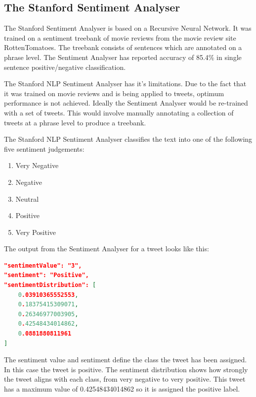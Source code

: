 \subsection*{The Stanford Sentiment Analyser}

The Stanford Sentiment Analyser is based on a Recursive Neural Network. It was trained on a sentiment treebank of movie reviews from the movie review site RottenTomatoes. The treebank consists of sentences which are annotated on a phrase level. The Sentiment Analyser has reported accuracy of 85.4\% in single sentence positive/negative classification. 

The Stanford NLP Sentiment Analyser has it's limitations. Due to the fact that it was trained on movie reviews and is being applied to tweets, optimum performance is not achieved. Ideally the Sentiment Analyser would be re-trained with a set of tweets. This would involve manually annotating a collection of tweets at a phrase level to produce a treebank.


The Stanford NLP Sentiment Analyser classifies the text into one of the following five sentiment judgements: 
\begin{enumerate}
    \item Very Negative
    \item Negative
    \item Neutral
    \item Positive
    \item Very Positive
\end{enumerate}

The output from the Sentiment Analyser for a tweet looks like this:

\begin{lstlisting}[caption={Output from Stanford NLP Sentiment Analyser},
captionpos=b,label=lst:stanfordoutput,language=json,firstnumber=1]
"sentimentValue": "3",
"sentiment": "Positive",
"sentimentDistribution": [
    0.03910365552553,
    0.18375415309071,
    0.26346977003905,
    0.42548434014862,
    0.0881880811961
]
\end{lstlisting}

The sentiment value and sentiment define the class the tweet has been assigned. In this case the tweet is positive. The sentiment distribution shows how strongly the tweet aligns with each class, from very negative to very positive. This tweet has a maximum value of 0.42548434014862 so it is assigned the positive label.

